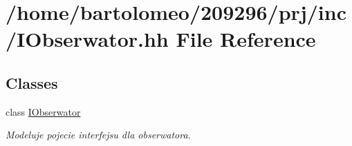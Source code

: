 \hypertarget{_i_obserwator_8hh}{\section{/home/bartolomeo/209296/prj/inc/\-I\-Obserwator.hh File Reference}
\label{_i_obserwator_8hh}
}
\subsection*{Classes}
\begin{DoxyCompactItemize}
\item 
class \hyperlink{class_i_obserwator}{I\-Obserwator}
\begin{DoxyCompactList}\small\item\em Modeluje pojecie interfejsu dla obserwatora. \end{DoxyCompactList}\end{DoxyCompactItemize}

